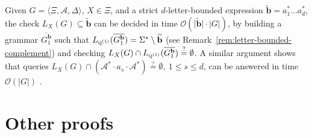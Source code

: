 \documentclass[final]{llncs}
\def\tuple#1{{\langle #1 \rangle}}
\def\len#1{{\vert{#1}\vert}}
\def\prod{\Delta}
\def\pat{{\mathbf{b}}}
\def\patt{{\widetilde{\mathbf{b}}}}
\def\Vars{\ensuremath{\Xi}}
\begin{document}
\begin{remark}\label{rem:letter-bounded-inclusion}
  Given $G = \tuple{\Vars,\mathcal{A},\prod}$, $X \in \Vars$, and a
  strict \(d\)-letter-bounded expression $\patt = a_1^* \ldots a_d^*$,
  the check $L_X(G) \subseteq \patt$ can be decided in time
  $\mathcal{O}(\len{\patt} \cdot \len{G})$, by building a grammar
  $\overline{G^{\pat}_1}$ such
  that \(L_{\textsc{q}^{(1)}}(\overline{G^{\pat}_1})
  = \Sigma^* \setminus \patt\) (see
  Remark~\ref{rem:letter-bounded-complement}) and
  checking \(L_X(G) \cap
  L_{\textsc{q}^{(1)}}(\overline{G^{\pat}_1}) \stackrel{?}{=} \emptyset\).
  A similar argument shows that queries $L_X(G) \cap
  (\mathcal{A}^* \cdot
  a_s \cdot \mathcal{A}^*) \stackrel{?}{=} \emptyset,~1 \leq s \leq
	d$, can be answered in time $\mathcal{O}(\len{G})$ \cite[Section~5]{BEF+ipl}.
\end{remark}

\section{Other proofs}\label{sec:hard}
\end{document}

